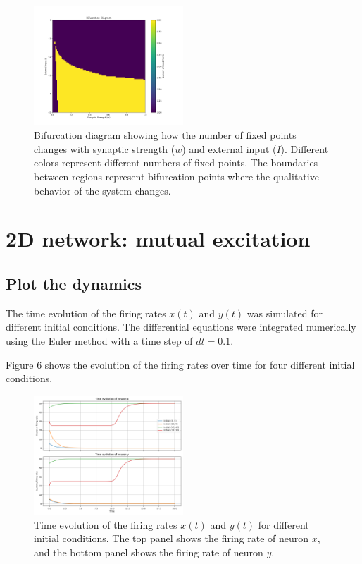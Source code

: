 \documentclass{article}
\begin{document}
\begin{figure}[H]
    \centering
    \includegraphics[width=0.5\textwidth]{bifurcation_diagram.png}
    \caption{Bifurcation diagram showing how the number of fixed points changes with synaptic strength ($w$) and external input ($I$). Different colors represent different numbers of fixed points. The boundaries between regions represent bifurcation points where the qualitative behavior of the system changes.}
    \label{fig:bifurcation}
\end{figure}




\section{2D network: mutual excitation}

\subsection{Plot the dynamics}

The time evolution of the firing rates $x(t)$ and $y(t)$ was simulated for different initial conditions. The differential equations were integrated numerically using the Euler method with a time step of $dt = 0.1$.

Figure 6 shows the evolution of the firing rates over time for four different initial conditions.


\begin{figure}[H]
    \centering
    \includegraphics[width=0.5\textwidth]{dynamics2_plot.png}
    \caption{Time evolution of the firing rates $x(t)$ and $y(t)$ for different initial conditions. The top panel shows the firing rate of neuron $x$, and the bottom panel shows the firing rate of neuron $y$.}
    \label{fig:dynamics}
\end{figure}
\end{document}
